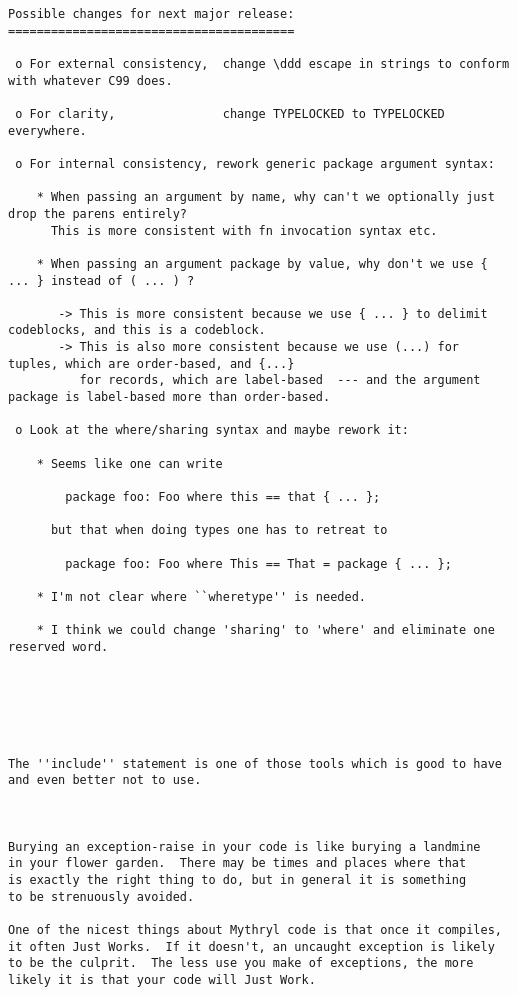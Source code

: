 \begin{verbatim}
Possible changes for next major release: 
========================================

 o For external consistency,  change \ddd escape in strings to conform with whatever C99 does. 

 o For clarity,               change TYPELOCKED to TYPELOCKED everywhere. 

 o For internal consistency, rework generic package argument syntax: 

    * When passing an argument by name, why can't we optionally just drop the parens entirely? 
      This is more consistent with fn invocation syntax etc. 

    * When passing an argument package by value, why don't we use { ... } instead of ( ... ) ? 

       -> This is more consistent because we use { ... } to delimit codeblocks, and this is a codeblock. 
       -> This is also more consistent because we use (...) for tuples, which are order-based, and {...} 
          for records, which are label-based  --- and the argument package is label-based more than order-based. 

 o Look at the where/sharing syntax and maybe rework it: 

    * Seems like one can write 

        package foo: Foo where this == that { ... }; 

      but that when doing types one has to retreat to  

        package foo: Foo where This == That = package { ... };  
     
    * I'm not clear where ``wheretype'' is needed. 

    * I think we could change 'sharing' to 'where' and eliminate one reserved word. 






The ''include'' statement is one of those tools which is good to have and even better not to use. 



Burying an exception-raise in your code is like burying a landmine 
in your flower garden.  There may be times and places where that 
is exactly the right thing to do, but in general it is something 
to be strenuously avoided. 

One of the nicest things about Mythryl code is that once it compiles, 
it often Just Works.  If it doesn't, an uncaught exception is likely 
to be the culprit.  The less use you make of exceptions, the more 
likely it is that your code will Just Work. 


\end{verbatim}
